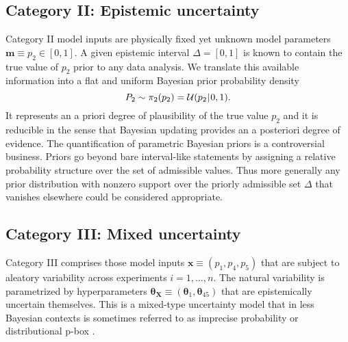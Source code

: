 \subsection{Category II: Epistemic uncertainty}
Category II model inputs are physically fixed yet unknown model parameters \(\bm{m} \equiv p_2 \in [0,1]\).
A given epistemic interval \(\Delta = [0,1]\) is known to contain the true value of \(p_2\) prior to any data analysis.
We translate this available information into a flat and uniform Bayesian prior probability density
\begin{equation} \label{eq:JAIS:Prior:p2}
  P_2 \sim \pi_2(p_2) = \mathcal{U}(p_2 {\:\!}|{\:\!} 0,1).
\end{equation}
It represents an a priori degree of plausibility of the true value \(p_2\) and it is reducible in the sense that Bayesian updating provides an a posteriori degree of evidence.
The quantification of parametric Bayesian priors is a controversial business.
Priors go beyond bare interval-like statements by assigning a relative probability structure over the set of admissible values.
Thus more generally any prior distribution with nonzero support over the priorly admissible set \(\Delta\) that vanishes elsewhere could be considered appropriate.

\subsection{Category III: Mixed uncertainty}
Category III comprises those model inputs \(\bm{x} \equiv (p_1,p_4,p_5)\) that are subject to aleatory variability across experiments \(i=1,\ldots,n\).
The natural variability is parametrized by hyperparameters \(\bm{\theta}_{\bm{X}} \equiv (\bm{\theta}_1,\bm{\theta}_{45})\) that are epistemically uncertain themselves.
This is a mixed-type uncertainty model that in less Bayesian contexts is sometimes referred to as imprecise probability or distributional p-box \cite{Uncertainty:Helton2004,Uncertainty:Helton2011}.

